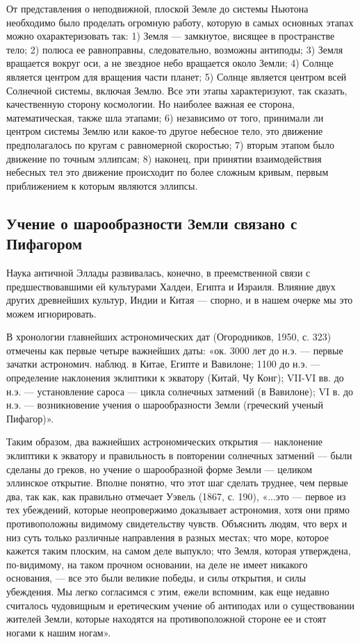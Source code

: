 От  представления  о неподвижной,  плоской  Земле  до системы  Ньютона
необходимо было  проделать огромную  работу, которую в  самых основных
этапах можно охарактеризовать  так: 1) Земля ---  замкнутое, висящее в
пространстве тело;  2) полюса ее равноправны,  следовательно, возможны
антиподы; 3) Земля вращается вокруг  оси, а не звездное небо вращается
около Земли; 4) Солнце является  центром для вращения части планет; 5)
Солнце является центром всей Солнечной системы, включая Землю. Все эти
этапы  характеризуют, так  сказать,  качественную сторону  космологии.
Но  наиболее важная  ее  сторона, математическая,  также шла  этапами;
6)  независимо  от  того,  принимали  ли  центром  системы  Землю  или
какое-то другое небесное тело, это движение предполагалось по кругам с
равномерной  скоростью;  7)  вторым  этапом было  движение  по  точным
эллипсам;  8) наконец,  при принятии  взаимодействия небесных  тел это
движение  происходит по  более сложным  кривым, первым  приближением к
которым являются эллипсы.

\subsection{Учение о шарообразности Земли связано с Пифагором}

Наука античной  Эллады развивалась,  конечно, в преемственной  связи с
предшествовавшими ей культурами Халдеи, Египта и Израиля. Влияние двух
других древнейших культур, Индии и Китая  --- спорно, и в нашем очерке
мы это можем игнорировать.

В  хронологии главнейших  астрономических дат  (Огородников, 1950,  с.
323) отмечены как первые четыре важнейших  даты: «ок. 3000 лет до н.э.
--- первые  зачатки астрономич.  наблюд. в  Китае, Египте  и Вавилоне;
1100 до н.э.  --- определение наклонения эклиптики  к экватору (Китай,
Чу  Конг);  VII-VI вв.  до  н.э.  ---  установление сароса  ---  цикла
солнечных  затмений (в  Вавилоне);  VI в.  до  н.э. ---  возникновение
учения о шарообразности Земли (греческий ученый Пифагор)».

Таким образом,  два важнейших астрономических открытия  --- наклонение
эклиптики к  экватору и  правильность в повторении  солнечных затмений
--- были сделаны  до греков, но учение о шарообразной  форме Земли ---
целиком  эллинское  открытие. Вполне  понятно,  что  этот шаг  сделать
труднее,  чем  первые два,  так  как,  как правильно  отмечает  Уэвель
(1867,  с.  190),  «...это  ---   первое  из  тех  убеждений,  которые
неопровержимо  доказывает астрономия,  хотя  они прямо  противоположны
видимому свидетельству  чувств. Объяснить людям,  что верх и  низ суть
только  различные  направления  в  разных местах;  что  море,  которое
кажется  таким плоским,  на  самом деле  выпукло;  что Земля,  которая
утверждена, по-видимому, на таком прочном  основании, на деле не имеет
никакого основания, --- все это  были великие победы, и силы открытия,
и силы убеждения. Мы легко согласимся  с этим, ежели вспомним, как еще
недавно считалось чудовищным  и еретическим учение об  антиподах или о
существовании  жителей  Земли,  которые находятся  на  противоположной
стороне ее и стоят ногами к нашим ногам».

